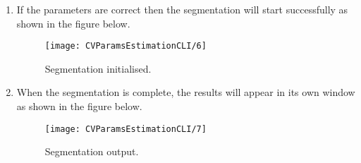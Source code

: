 \documentclass[
11pt, %
a4paper, %
oneside, %
headinclude,footinclude, %
BCOR5mm, %
]{scrartcl}
\begin{document}
\begin{enumerate}
\newpage
\item If the parameters are correct then the segmentation will start successfully as shown in the figure below.
\begin{figure}[h]
	\centering
	\texttt{[image: CVParamsEstimationCLI/6]}
	\caption{Segmentation initialised.}
\end{figure}

\item When the segmentation is complete, the results will appear in its own window as shown in the figure below.
\begin{figure}[h]
	\centering
	\texttt{[image: CVParamsEstimationCLI/7]}
	\caption{Segmentation output.}
\end{figure}
\end{enumerate}

\clearpage
\end{document}
